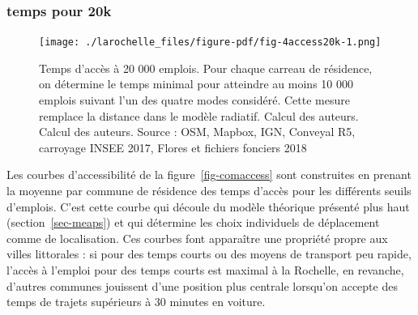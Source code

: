 \documentclass[
  10pt,
  a4paper,
  numbers=noendperiod,
  DIV=9]{scrreprt}
\begin{document}
\hypertarget{temps-pour-20k}{%
\subsubsection{temps pour 20k}\label{temps-pour-20k}}

\begin{figure}[htb]

{\centering \texttt{[image: ./larochelle\_files/figure-pdf/fig-4access20k-1.png]}

}

\caption[Accessibilité à 20 000 emplois pour la
Rochelle]{\label{fig-4access20k}Temps d'accès à 20 000 emplois. Pour
chaque carreau de résidence, on détermine le temps minimal pour
atteindre au moins 10 000 emplois suivant l'un des quatre modes
considéré. Cette mesure remplace la distance dans le modèle radiatif.
Calcul des auteurs. Calcul des auteurs. Source : OSM, Mapbox, IGN,
Conveyal R5, carroyage INSEE 2017, Flores et fichiers fonciers 2018}

\end{figure}

Les courbes d'accessibilité de la figure~\ref{fig-comaccess} sont
construites en prenant la moyenne par commune de résidence des temps
d'accès pour les différents seuils d'emplois. C'est cette courbe qui
découle du modèle théorique présenté plus haut (section~\ref{sec-meaps})
et qui détermine les choix individuels de déplacement comme de
localisation. Ces courbes font apparaître une propriété propre aux
villes littorales : si pour des temps courts ou des moyens de transport
peu rapide, l'accès à l'emploi pour des temps courts est maximal à la
Rochelle, en revanche, d'autres communes jouissent d'une position plus
centrale lorsqu'on accepte des temps de trajets supérieurs à 30 minutes
en voiture.
\end{document}
